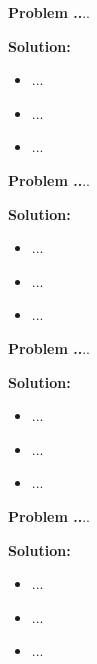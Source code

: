 \documentclass{article}
\theoremstyle{problemstyle}
\newenvironment{boxedproblem}[1]
{\begin{tcolorbox}[colback=white, colframe=black, boxrule=0.5pt]\noindent\textbf{Problem #1.}}
{\end{tcolorbox}}
\begin{document}
    
    \begin{boxedproblem}{44}
    ...
    \end{boxedproblem}
    
    \textbf{Solution:}
    \begin{itemize}[label={},leftmargin=1.25cm,nosep]
        \item ...
        \item ...
        \item ...
    \end{itemize}
    
    
    \begin{boxedproblem}{45}
    ...
    \end{boxedproblem}
    
    \textbf{Solution:}
    \begin{itemize}[label={},leftmargin=1.25cm,nosep]
        \item ...
        \item ...
        \item ...
    \end{itemize}
    
    
    \begin{boxedproblem}{46}
    ...
    \end{boxedproblem}
    
    \textbf{Solution:}
    \begin{itemize}[label={},leftmargin=1.25cm,nosep]
        \item ...
        \item ...
        \item ...
    \end{itemize}
    
    
    \begin{boxedproblem}{47}
    ...
    \end{boxedproblem}
    
    \textbf{Solution:}
    \begin{itemize}[label={},leftmargin=1.25cm,nosep]
        \item ...
        \item ...
        \item ...
    \end{itemize}
    
\end{document}
